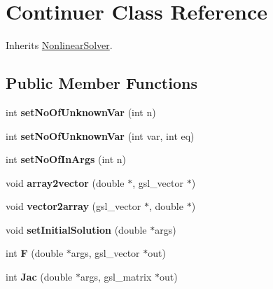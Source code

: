 \hypertarget{class_continuer}{
\section{Continuer Class Reference}
\label{class_continuer}
}


Inherits \hyperlink{class_nonlinear_solver}{NonlinearSolver}.\subsection*{Public Member Functions}
\begin{DoxyCompactItemize}
\item 
\hypertarget{class_continuer_a36bd899f073e29ede0808f4309893afe}{
int {\bfseries setNoOfUnknownVar} (int n)}
\label{class_continuer_a36bd899f073e29ede0808f4309893afe}

\item 
\hypertarget{class_continuer_a85238a5b9c88350c2e9af68f25934a5f}{
int {\bfseries setNoOfUnknownVar} (int var, int eq)}
\label{class_continuer_a85238a5b9c88350c2e9af68f25934a5f}

\item 
\hypertarget{class_continuer_a7641f58bc5df33d67ca0c8e16f8f6078}{
int {\bfseries setNoOfInArgs} (int n)}
\label{class_continuer_a7641f58bc5df33d67ca0c8e16f8f6078}

\item 
\hypertarget{class_continuer_a3e19597685ab73459bab995ef31a47ce}{
void {\bfseries array2vector} (double $\ast$, gsl\_\-vector $\ast$)}
\label{class_continuer_a3e19597685ab73459bab995ef31a47ce}

\item 
\hypertarget{class_continuer_ac72f8b50665e59cddc9175f16046322b}{
void {\bfseries vector2array} (gsl\_\-vector $\ast$, double $\ast$)}
\label{class_continuer_ac72f8b50665e59cddc9175f16046322b}

\item 
\hypertarget{class_continuer_a6d57b35efcbd6136adcf23cd269d59e7}{
void {\bfseries setInitialSolution} (double $\ast$args)}
\label{class_continuer_a6d57b35efcbd6136adcf23cd269d59e7}

\item 
\hypertarget{class_continuer_a52f467adffa200d15e7a9d11274a810b}{
int {\bfseries F} (double $\ast$args, gsl\_\-vector $\ast$out)}
\label{class_continuer_a52f467adffa200d15e7a9d11274a810b}

\item 
\hypertarget{class_continuer_a134487d3e26f143dc80677f71c80cf0e}{
int {\bfseries Jac} (double $\ast$args, gsl\_\-matrix $\ast$out)}
\label{class_continuer_a134487d3e26f143dc80677f71c80cf0e}


\end{DoxyCompactItemize}
